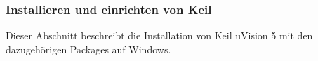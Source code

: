\subsubsection{Installieren und einrichten von Keil}
\label{sec:KeilInstall}

Dieser Abschnitt beschreibt die Installation von Keil uVision 5 mit den dazugehörigen Packages auf Windows.
